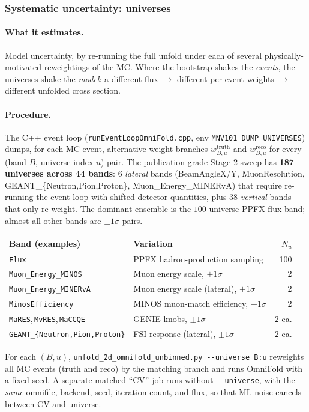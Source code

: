 \subsubsection{Systematic uncertainty: universes}
\label{sec:universes}

\paragraph{What it estimates.}
Model uncertainty, by re-running the full unfold under each of
several physically-motivated reweightings of the MC. Where the
bootstrap shakes the \emph{events}, the universes shake the
\emph{model}: a different flux $\to$ different per-event weights $\to$
different unfolded cross section.

\paragraph{Procedure.}
The C++ event loop (\texttt{runEventLoopOmniFold.cpp}, env
\texttt{MNV101\_DUMP\_UNIVERSES}) dumps, for each MC event,
alternative weight branches $w^{\text{truth}}_{B,u}$ and
$w^{\text{reco}}_{B,u}$ for every (band $B$, universe index $u$)
pair. The publication-grade Stage-2 sweep has \textbf{187 universes
across 44 bands}: $6$ \emph{lateral} bands (BeamAngleX/Y,
MuonResolution, GEANT\_\{Neutron,Pion,Proton\}, Muon\_Energy\_MINERvA)
that require re-running the event loop with shifted detector
quantities, plus $38$ \emph{vertical} bands that only re-weight. The
dominant ensemble is the $100$-universe PPFX flux band; almost all
other bands are $\pm1\sigma$ pairs.

\begin{center}
\begin{tabular}{@{}llr@{}}
\toprule
Band (examples) & Variation & $N_{u}$ \\
\midrule
\texttt{Flux} & PPFX hadron-production sampling & 100 \\
\texttt{Muon\_Energy\_MINOS} & Muon energy scale, $\pm 1\sigma$ & 2 \\
\texttt{Muon\_Energy\_MINERvA} & Muon energy scale (lateral), $\pm1\sigma$ & 2 \\
\texttt{MinosEfficiency} & MINOS muon-match efficiency, $\pm 1\sigma$ & 2 \\
\texttt{MaRES},\,\texttt{MvRES},\,\texttt{MaCCQE} & GENIE knobs, $\pm 1\sigma$ & 2 ea. \\
\texttt{GEANT\_\{Neutron,Pion,Proton\}} & FSI response (lateral), $\pm1\sigma$ & 2 ea. \\
\bottomrule
\end{tabular}
\end{center}
For each $(B,u)$, \texttt{unfold\_2d\_omnifold\_unbinned.py
-{}-universe B:u} reweights all MC events (truth and reco) by the
matching branch and runs OmniFold with a fixed seed. A separate
matched ``CV'' job runs without \texttt{-{}-universe}, with the
\emph{same} omnifile, backend, seed, iteration count, and flux, so
that ML noise cancels between CV and universe.

